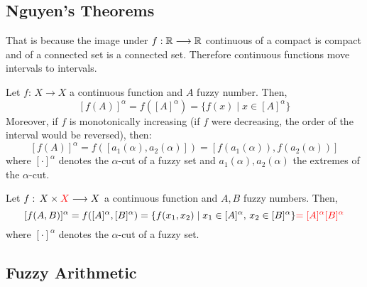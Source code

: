 \subsection{Nguyen's Theorems}

That is because the image under $f:\mathbb{R} \longrightarrow \mathbb{R}$ continuous of a compact is compact and of a connected set is a connected set. Therefore continuous functions move intervals to intervals.

\begin{theorem}
    Let $f:\, X \longrightarrow X$ a continuous function and $A$  fuzzy number. Then,
    \[
    [f(A)]^{\alpha} = f([A]^{\alpha})=\{f(x)\mid x\in [A]^\alpha\}
    \]
    Moreover, if $f$ is monotonically increasing (if $f$ were decreasing, the order of the interval would be reversed), then:
    \[
    [f(A)]^{\alpha} = f([a_1(\alpha), a_2(\alpha)])=
    [f(a_1(\alpha)), f(a_2(\alpha))]
    \]
    where $[\cdot]^\alpha$ denotes the $\alpha$-cut of a fuzzy set and $a_1(\alpha), a_2(\alpha)$ the extremes of the $\alpha$-cut.
\end{theorem}


\begin{theorem}
    Let $f:\, X \times {\color{red}X}\longrightarrow X$ a continuous function and $A,B$  fuzzy numbers. Then,
    \[
    [f(A,B)]^{\alpha} = f([A]^{\alpha},[B]^{\alpha})=\{f(x_1,x_2)\mid x_1\in [A]^\alpha, \, x_2\in [B]^\alpha\}
    {\color{red}=[A]^\alpha [B]^\alpha}
    \]
    where $[\cdot]^\alpha$ denotes the $\alpha$-cut of a fuzzy set.
\end{theorem}





\subsection{Fuzzy Arithmetic}


